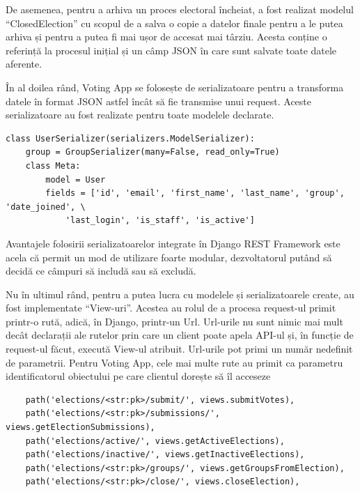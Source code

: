 De asemenea, pentru a arhiva un proces electoral încheiat, a fost realizat modelul \enquote{ClosedElection} cu scopul de a salva o copie a datelor finale pentru a le putea arhiva și pentru a putea fi mai ușor de accesat mai târziu. Acesta conține o referință la procesul inițial și un câmp JSON în care sunt salvate toate datele aferente.

În al doilea rând, Voting App se folosește de serializatoare pentru a transforma datele în format JSON astfel încât să fie transmise unui request. Aceste serializatoare au fost realizate pentru toate modelele declarate.

\begin{code}
\begin{verbatim}
class UserSerializer(serializers.ModelSerializer):
    group = GroupSerializer(many=False, read_only=True)
    class Meta:
        model = User
        fields = ['id', 'email', 'first_name', 'last_name', 'group', 'date_joined', \
            'last_login', 'is_staff', 'is_active']
\end{verbatim}
\label{code:serializer-code}
\end{code}
\hfill

Avantajele folosirii serializatoarelor integrate în Django REST Framework este acela că permit un mod de utilizare foarte modular, dezvoltatorul putând să decidă ce câmpuri să includă sau să excludă.

\hfill

Nu în ultimul rând, pentru a putea lucra cu modelele și serializatoarele create, au fost implementate \enquote{View-uri}. Acestea au rolul de a procesa request-ul primit printr-o rută, adică, în Django, printr-un Url. Url-urile nu sunt nimic mai mult decât declarații ale rutelor prin care un client poate apela API-ul și, în funcție de request-ul făcut, execută View-ul atribuit. Url-urile pot primi un număr nedefinit de parametrii. Pentru Voting App, cele mai multe rute au primit ca parametru identificatorul obiectului pe care clientul dorește să îl acceseze

\begin{code}
\begin{verbatim}
    path('elections/<str:pk>/submit/', views.submitVotes),
    path('elections/<str:pk>/submissions/', views.getElectionSubmissions),
    path('elections/active/', views.getActiveElections),
    path('elections/inactive/', views.getInactiveElections),
    path('elections/<str:pk>/groups/', views.getGroupsFromElection),
    path('elections/<str:pk>/close/', views.closeElection),
\end{verbatim}
\label{code:url-code}
\end{code}
\hfill

